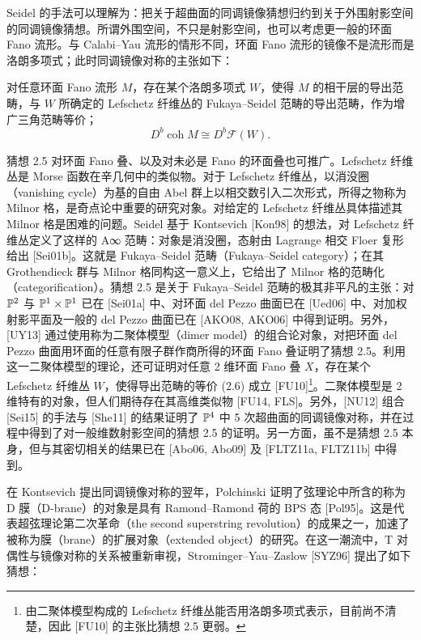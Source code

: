 Seidel 的手法可以理解为：把关于超曲面的同调镜像猜想归约到关于外围射影空间的同调镜像猜想。所谓外围空间，不只是射影空间，也可以考虑更一般的环面 Fano 流形。与 Calabi–Yau 流形的情形不同，环面 Fano 流形的镜像不是流形而是洛朗多项式；此时同调镜像对称的主张如下：

 对任意环面 Fano 流形 $M$，存在某个洛朗多项式 $W$，使得 $M$ 的相干层的导出范畴，与 $W$ 所确定的 Lefschetz 纤维丛的 Fukaya–Seidel 范畴的导出范畴，作为增广三角范畴等价；
\begin{equation}
    D^b\operatorname{coh}M\cong D^b\mathcal{F}(W). \tag{2.6}
\end{equation}

猜想 2.5 对环面 Fano 叠、以及对未必是 Fano 的环面叠也可推广。Lefschetz 纤维丛是 Morse 函数在辛几何中的类似物。对于 Lefschetz 纤维丛，以消没圈（vanishing cycle）为基的自由 Abel 群上以相交数引入二次形式，所得之物称为 Milnor 格，是奇点论中重要的研究对象。对给定的 Lefschetz 纤维丛具体描述其 Milnor 格是困难的问题。Seidel 基于 Kontsevich [Kon98] 的想法，对 Lefschetz 纤维丛定义了这样的 A∞ 范畴：对象是消没圈，态射由 Lagrange 相交 Floer 复形给出 [Sei01b]。这就是 Fukaya–Seidel 范畴（Fukaya–Seidel category）；在其 Grothendieck 群与 Milnor 格同构这一意义上，它给出了 Milnor 格的范畴化（categorification）。猜想 2.5 是关于 Fukaya–Seidel 范畴的极其非平凡的主张：对 $\mathbb{P}^2$ 与 $\mathbb{P}^1\times\mathbb{P}^1$ 已在 [Sei01a] 中、对环面 del Pezzo 曲面已在 [Ued06] 中、对加权射影平面及一般的 del Pezzo 曲面已在 [AKO08, AKO06] 中得到证明。另外，[UY13] 通过使用称为二聚体模型（dimer model）的组合论对象，对把环面 del Pezzo 曲面用环面的任意有限子群作商所得的环面 Fano 叠证明了猜想 2.5。利用这一二聚体模型的理论，还可证明对任意 2 维环面 Fano 叠 $X$，存在某个 Lefschetz 纤维丛 $W$，使得导出范畴的等价 (2.6) 成立 [FU10]\footnote{由二聚体模型构成的 Lefschetz 纤维丛能否用洛朗多项式表示，目前尚不清楚，因此 [FU10] 的主张比猜想 2.5 更弱。}。二聚体模型是 2 维特有的对象，但人们期待存在其高维类似物 [FU14, FLS]。另外，[NU12] 组合 [Sei15] 的手法与 [She11] 的结果证明了 $\mathbb{P}^4$ 中 5 次超曲面的同调镜像对称，并在过程中得到了对一般维数射影空间的猜想 2.5 的证明。另一方面，虽不是猜想 2.5 本身，但与其密切相关的结果已在 [Abo06, Abo09] 及 [FLTZ11a, FLTZ11b] 中得到。

在 Kontsevich 提出同调镜像对称的翌年，Polchinski 证明了弦理论中所含的称为 D 膜（D-brane）的对象是具有 Ramond–Ramond 荷的 BPS 态 [Pol95]。这是代表超弦理论第二次革命（the second superstring revolution）的成果之一，加速了被称为膜（brane）的扩展对象（extended object）的研究。在这一潮流中，T 对偶性与镜像对称的关系被重新审视，Strominger–Yau–Zaslow [SYZ96] 提出了如下猜想：

